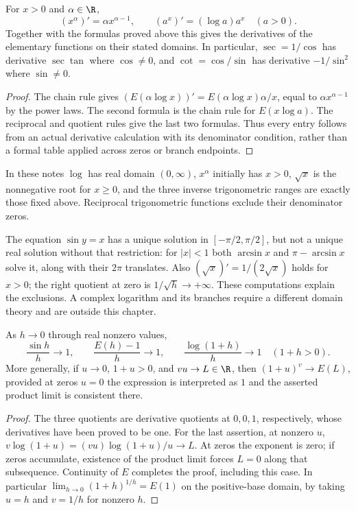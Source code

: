 \begin{proposition}
For $x>0$ and $\alpha\in\R$,
\[(x^\alpha)'=\alpha x^{\alpha-1},\qquad
(a^x)'=(\log a)a^x\quad(a>0).
\]
Together with the formulas proved above this gives the derivatives of the
elementary functions on their stated domains. In particular, $\sec=1/\cos$
has derivative $\sec\tan$ where $\cos\ne0$, and $\cot=\cos/\sin$ has
derivative $-1/\sin^2$ where $\sin\ne0$.
\end{proposition}
\begin{proof}
The chain rule gives $(E(\alpha\log x))'=E(\alpha\log x)\alpha/x$,
equal to $\alpha x^{\alpha-1}$ by the power laws. The second formula is
the chain rule for $E(x\log a)$. The reciprocal and quotient rules give
the last two formulas. Thus every entry follows from an actual derivative
calculation with its denominator condition, rather than a formal table
applied across zeros or branch endpoints.
\end{proof}

\begin{definition}
In these notes $\log$ has real domain $(0,\infty)$, $x^\alpha$ initially
has $x>0$, $\sqrt{x}$ is the nonnegative root for $x\ge0$, and the three
inverse trigonometric ranges are exactly those fixed above. Reciprocal
trigonometric functions exclude their denominator zeros.
\end{definition}
\begin{example}
The equation $\sin y=x$ has a unique solution in $[-\pi/2,\pi/2]$, but
not a unique real solution without that restriction: for $|x|<1$ both
$\arcsin x$ and $\pi-\arcsin x$ solve it, along with their $2\pi$
translates. Also $(\sqrt{x})'=1/(2\sqrt{x})$ holds for $x>0$;
the right quotient at zero is $1/\sqrt{h}\to+\infty$.
These computations explain the exclusions. A complex logarithm and its
branches require a different domain theory and are outside this chapter.
\end{example}

\begin{theorem}
As $h\to0$ through real nonzero values,
\[\frac{\sin h}{h}\to1,\qquad\frac{E(h)-1}{h}\to1,\qquad
\frac{\log(1+h)}h\to1\quad(1+h>0).
\]
More generally, if $u\to0$, $1+u>0$, and $v u\to L\in\R$, then
$(1+u)^v\to E(L)$, provided at zeros $u=0$ the expression is interpreted
as $1$ and the asserted product limit is consistent there.
\end{theorem}
\begin{proof}
The three quotients are derivative quotients at $0,0,1$, respectively,
whose derivatives have been proved to be one. For the last assertion,
at nonzero $u$,
$v\log(1+u)=(vu)\log(1+u)/u\to L$.
At zeros the exponent is zero; if zeros accumulate, existence of the
product limit forces $L=0$ along that subsequence. Continuity of $E$
completes the proof, including this case.
In particular $\lim_{h\to0}(1+h)^{1/h}=E(1)$ on the positive-base
domain, by taking $u=h$ and $v=1/h$ for nonzero $h$.
\end{proof}

